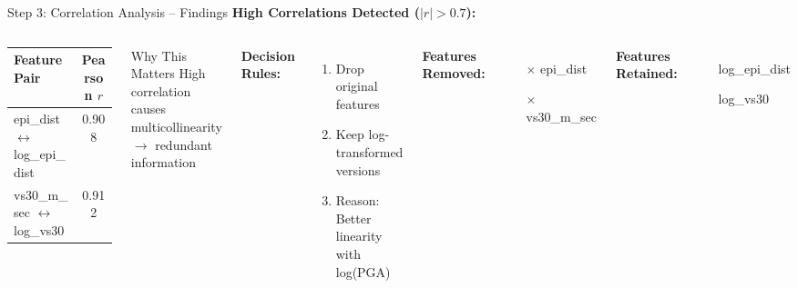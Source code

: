 \documentclass[aspectratio=169,11pt]{beamer}
\begin{document}
\begin{frame}{Step 3: Correlation Analysis -- Findings}
\textbf{High Correlations Detected ($|r| > 0.7$):}
\vspace{0.2cm}

\begin{columns}[T]
\begin{table}
\centering
\begin{tabular}{@{}lc@{}}
\toprule
\textbf{Feature Pair} & \textbf{Pearson $r$} \\
\midrule
epi\_dist $\leftrightarrow$ log\_epi\_dist & 0.908 \\
vs30\_m\_sec $\leftrightarrow$ log\_vs30 & 0.912 \\
\bottomrule
\end{tabular}
\end{table}

\vspace{0.3cm}
\begin{alertblock}{Why This Matters}
High correlation causes multicollinearity $\rightarrow$ redundant information
\end{alertblock}

\textbf{Decision Rules:}
\begin{enumerate}
    \item \textcolor{alertred}{Drop} original features
    \item \textcolor{successgreen}{Keep} log-transformed versions
    \item Reason: Better linearity with log(PGA)
\end{enumerate}

\vspace{0.3cm}
\textbf{Features Removed:}
\begin{itemize}
    \item[$\times$] epi\_dist
    \item[$\times$] vs30\_m\_sec
\end{itemize}

\textbf{Features Retained:}
\begin{itemize}
    \item[\checkmark] log\_epi\_dist
    \item[\checkmark] log\_vs30
\end{itemize}
\end{columns}
\end{frame}
\end{document}
